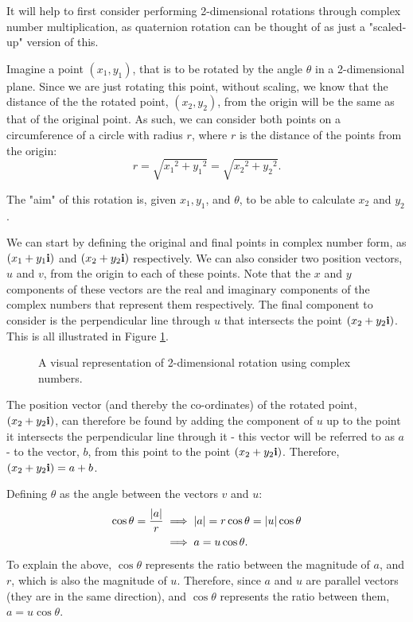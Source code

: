 \documentclass[10pt]{article}
\begin{document}
It will help to first consider performing 2-dimensional rotations \cite{ComplexRotation} through complex number multiplication, as quaternion rotation can be thought of as just a "scaled-up" version of this.

Imagine a point $(x_1, y_1)$, that is to be rotated by the angle $\theta$ in a 2-dimensional plane. Since we are just rotating this point, without scaling, we know that the distance of the the rotated point, $(x_2, y_2)$, from the origin will be the same as that of the original point. As such, we can consider both points on a circumference of a circle with radius $r$, where $r$ is the distance of the points from the origin:
\begin{equation}
    r = \sqrt{{x_1}^2 + {y_1}^2} = \sqrt{{x_2}^2 + {y_2}^2}.
\end{equation}

The "aim" of this rotation is, given $x_1, y_1$, and $\theta$, to be able to calculate $x_2$ and $y_2$.

We can start by defining the original and final points in complex number form, as $(x_1 + y_1\vb{i})$ and $(x_2 + y_2\vb{i})$ respectively. We can also consider two position vectors, $u$ and $v$, from the origin to each of these points. Note that the $x$ and $y$ components of these vectors are the real and imaginary components of the complex numbers that represent them respectively. The final component to consider is the perpendicular line through $u$ that intersects the point $(x_2 + y_2\vb{i})$. This is all illustrated in Figure \ref{ComplexRotationFig}.

\begin{figure}[H]
    \centering
    \caption{A visual representation of 2-dimensional rotation using complex numbers.}
    \label{ComplexRotationFig}
\end{figure}

The position vector (and thereby the co-ordinates) of the rotated point, $(x_2 + y_2\vb{i})$, can therefore be found by adding the component of $u$ up to the point it intersects the perpendicular line through it - this vector will be referred to as $a$ - to the vector, $b$, from this point to the point $(x_2 + y_2\vb{i})$. Therefore, $(x_2 + y_2\vb{i}) = a + b$.

Defining $\theta$ as the angle between the vectors $v$ and $u$:
\begin{equation}
    \begin{aligned}
        \cos\theta = \frac{\abs{a}}{r} &\implies \abs{a} = r\cos\theta = \abs{u}\cos\theta \\
        &\implies a = u\cos\theta.
    \end{aligned}
\end{equation}
To explain the above, $\cos\theta$ represents the ratio between the magnitude of $a$, and $r$, which is also the magnitude of $u$. Therefore, since $a$ and $u$ are parallel vectors (they are in the same direction), and $\cos\theta$ represents the ratio between them, $a = u\cos\theta$.
\end{document}
